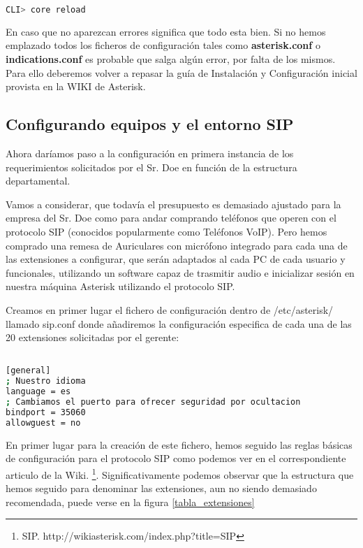 \begin{lstlisting}[language=sh]
CLI> core reload
\end{lstlisting}

En caso que no aparezcan errores significa que todo esta bien. Si no hemos emplazado todos los ficheros de configuración tales como \textbf{asterisk.conf} o \textbf{indications.conf} es probable que salga algún error, por falta de los mismos. Para ello deberemos volver a repasar la guía de Instalación y Configuración inicial provista en la WIKI de Asterisk.

\newpage

\subsection{Configurando equipos y el entorno SIP}

Ahora daríamos paso a la configuración en primera instancia de los requerimientos solicitados por el Sr. Doe en función de la estructura departamental.

Vamos a considerar, que todavía el presupuesto es demasiado ajustado para la empresa del Sr. Doe como para andar comprando teléfonos que operen con el protocolo SIP \cite{johnston09} (conocidos popularmente como Teléfonos VoIP). Pero hemos comprado una remesa de Auriculares con micrófono integrado para cada una de las extensiones a configurar, que serán adaptados al cada PC de cada usuario y funcionales, utilizando un software capaz de trasmitir audio e inicializar sesión en nuestra máquina Asterisk utilizando el protocolo SIP.

Creamos en primer lugar el fichero de configuración dentro de /etc/asterisk/ llamado sip.conf donde añadiremos la configuración especifica de cada una de las 20 extensiones solicitadas por el gerente:

\begin{lstlisting}[language=bash,title={/etc/asterisk/sip.conf}]

[general]
; Nuestro idioma
language = es
; Cambiamos el puerto para ofrecer seguridad por ocultacion
bindport = 35060
allowguest = no

\end{lstlisting}

En primer lugar para la creación de este fichero, hemos seguido las reglas básicas de configuración para el protocolo SIP como podemos ver en el correspondiente articulo de la Wiki. \footnote{SIP. http://wikiasterisk.com/index.php?title=SIP}. Significativamente podemos observar que la estructura que hemos seguido para denominar las extensiones, aun no siendo demasiado recomendada, puede verse en la figura \ref{tabla_extensiones}

